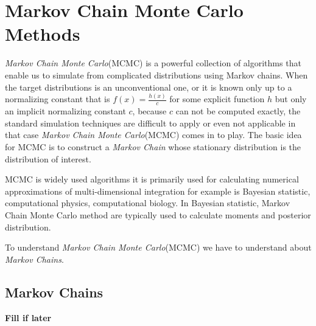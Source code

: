\chapter{Markov Chain Monte Carlo Methods}

\textit{Markov Chain Monte Carlo}(MCMC) is a powerful collection of algorithms that enable us to simulate from complicated distributions using Markov chains. 
When the target distributions is an unconventional one, or it is known only up to a normalizing constant that is $ f(x) = \frac{h(x)}{c} $ for some explicit function $ h $ but only an implicit normalizing constant $ c $, because $ c $ can not be computed exactly, the standard simulation techniques are difficult to apply or even not applicable in that case \textit{Markov Chain Monte Carlo}(MCMC) comes in to play.
The basic idea for MCMC is to construct a \textit{Markov Chain} whose stationary distribution is the distribution of interest.

MCMC is widely used algorithms it is primarily used for calculating numerical approximations  of multi-dimensional integration for example is Bayesian statistic, computational physics, computational biology.
In Bayesian statistic, Markov Chain Monte Carlo method are typically used to calculate moments and posterior distribution.

To understand \textit{Markov Chain Monte Carlo}(MCMC) we have to understand about \textit{Markov Chains}.  

\section{Markov Chains}

\textbf{Fill if later} 
